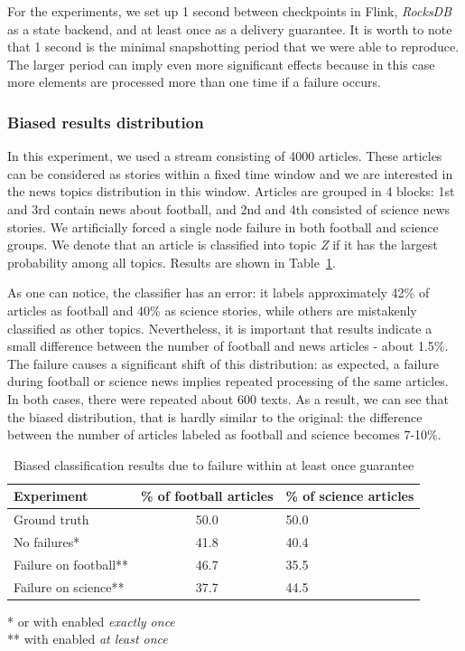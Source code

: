 For the experiments, we set up 1 second between checkpoints in Flink, {\em RocksDB} as a state backend, and at least once as a delivery guarantee. It is worth to note that 1 second is the minimal snapshotting period that we were able to reproduce. The larger period can imply even more significant effects because in this case more elements are processed more than one time if a failure occurs.

\subsubsection{Biased results distribution}

In this experiment, we used a stream consisting of 4000 articles. These articles can be considered as stories within a fixed time window and we are interested in the news topics distribution in this window. Articles are grouped in 4 blocks: 1st and 3rd contain news about football, and 2nd and 4th consisted of science news stories. We artificially forced a  single node failure in both football and science groups. We denote that an article is classified into topic {\em Z} if it has the largest probability among all topics. Results are shown in Table~\ref{biased_results}.

 As one can notice, the classifier has an error: 
it labels approximately 42\% of articles as football and 40\% as science stories, while others are mistakenly classified as other topics. Nevertheless, it is important that results indicate a small difference between the number of football and news articles - about 1.5\%. The failure causes a significant shift of this distribution: as expected, a failure during football or science news implies repeated processing of the same articles. In both cases, there were repeated about 600 texts. As a result, we can see that the biased distribution, that is hardly similar to the original: the difference between the number of articles labeled as football and science becomes 7-10\%. 

\begin{table}[htbp]
\caption{Biased classification results due to failure within at least once guarantee}
\begin{threeparttable}
\begin{tabular}{lcl}
Experiment    & \% of football articles & \% of science articles    \\
\hline
Ground truth   &   50.0    &   50.0    \\
No failures*   &   41.8    &   40.4    \\
Failure on football**   &   46.7    &   35.5    \\
Failure on science**   &   37.7    &   44.5    \\
\end{tabular}
* or with enabled {\em exactly once} \\
** with enabled {\em at least once}
\end{threeparttable}
\label{biased_results}
\end{table}

